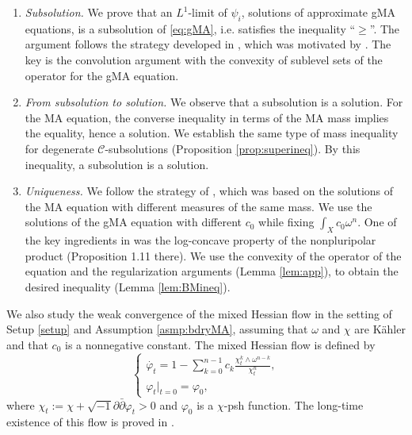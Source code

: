 \documentclass[10pt,a4paper]{amsart}
\numberwithin{equation}{section}
\newcommand{\delb}{\sqrt{-1}\partial\bar{\partial}}
\begin{document}
\begin{enumerate}[label={Step \arabic*}]
    \item\label{step:subsol} \textit{Subsolution.} We prove that an $L^1$-limit of $\psi_i$, solutions of approximate gMA equations, is a subsolution of \eqref{eq:gMA}, i.e. satisfies the inequality ``$\ge$''. The argument follows the strategy developed in \cite{Mur}, which was motivated by \cite[Proposition 21]{CS17}. The key is the convolution argument with the convexity of sublevel sets of the operator for the gMA equation.
    
    \item\label{step:sol} \textit{From subsolution to solution.} We observe that a subsolution is a solution. For the MA equation, the converse inequality in terms of the MA mass \cite[Proposition 1.20]{BEGZ} implies the equality, hence a solution. We establish the same type of mass inequality for degenerate $\mathcal{C}$-subsolutions (Proposition \ref{prop:superineq}). By this inequality, a subsolution is a solution.

    \item\label{step:uni} \textit{Uniqueness.} We follow the strategy of \cite[Section 3.3]{BEGZ}, which was based on the solutions of the MA equation with different measures of the same mass. We use the solutions of the gMA equation with different $c_0$ while fixing $\int_Xc_0\omega^n$. One of the key ingredients in \cite[Section 3.3]{BEGZ} was the log-concave property of the nonpluripolar product (Proposition 1.11 there). We use the convexity of the operator of the equation and the regularization arguments (Lemma \ref{lem:app}), to obtain the desired inequality (Lemma \ref{lem:BMineq}).
\end{enumerate}

We also study the weak convergence of the mixed Hessian flow in the setting of Setup \ref{setup} and Assumption \ref{asmp:bdryMA}, assuming that $\omega$ and $\chi$ are Kähler and that $c_0$ is a nonnegative constant.
The mixed Hessian flow is defined by
\begin{equation*}
    \begin{cases}
        \dot{\varphi_t}=1-\sum_{k=0}^{n-1}c_k\frac{\chi_t^k\wedge\omega^{n-k}}{\chi_t^n},\\
        \varphi_t|_{t=0}=\varphi_0,
    \end{cases}
\end{equation*}
where $\chi_t:=\chi+\delb \varphi_t>0$ and $\varphi_0$ is a $\chi$-psh function. The long-time existence of this flow is proved in \cite[Proposition 13]{CS17}.
\end{document}
